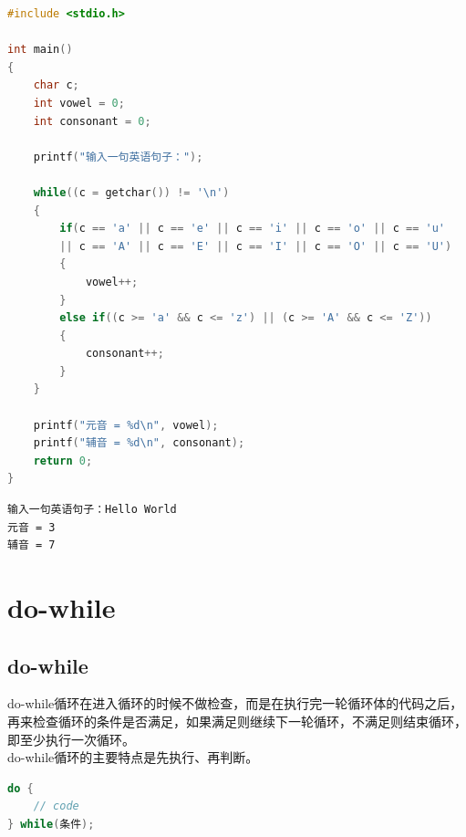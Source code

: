 \vspace{0.5cm}


\begin{lstlisting}[language=C]
#include <stdio.h>

int main()
{
    char c;
    int vowel = 0;
    int consonant = 0;

    printf("输入一句英语句子：");

    while((c = getchar()) != '\n')
    {
        if(c == 'a' || c == 'e' || c == 'i' || c == 'o' || c == 'u' 
        || c == 'A' || c == 'E' || c == 'I' || c == 'O' || c == 'U')
        {
            vowel++;
        }
        else if((c >= 'a' && c <= 'z') || (c >= 'A' && c <= 'Z'))
        {
            consonant++;
        }
    }

    printf("元音 = %d\n", vowel);
    printf("辅音 = %d\n", consonant);
    return 0;
}
\end{lstlisting}

\begin{tcolorbox}
	\begin{verbatim}
输入一句英语句子：Hello World
元音 = 3
辅音 = 7
\end{verbatim}
\end{tcolorbox}

\newpage

\section{do-while}

\subsection{do-while}

do-while循环在进入循环的时候不做检查，而是在执行完一轮循环体的代码之后，再来检查循环的条件是否满足，如果满足则继续下一轮循环，不满足则结束循环，即至少执行一次循环。\\

do-while循环的主要特点是先执行、再判断。

\vspace{-0.5cm}

\begin{lstlisting}[language=C]
do {
    // code
} while(条件);
\end{lstlisting}

\vspace{0.5cm}


